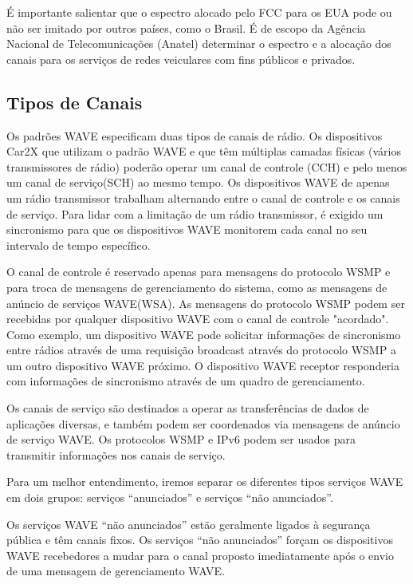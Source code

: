 \documentclass[
12pt,				%
openright,			%
oneside,			%
a4paper,			%
brazil,				%
]{abntex2}
\begin{document}
	\par É importante salientar que o espectro alocado pelo FCC para os EUA pode ou não ser imitado por outros países, como o Brasil. É de escopo da Agência Nacional de Telecomunicações (Anatel) determinar o espectro e a alocação dos canais para os serviços de redes veiculares com fins públicos e privados.
	
	\subsection{Tipos de Canais}
	
	\par Os padrões WAVE especificam duas tipos de canais de rádio. Os dispositivos Car2X que utilizam o padrão WAVE e que têm múltiplas camadas físicas (vários transmissores de rádio) poderão operar um canal de controle (CCH) e pelo menos um canal de serviço(SCH) ao mesmo tempo. Os dispositivos WAVE de apenas um rádio transmissor trabalham alternando entre o canal de controle e os canais de serviço. Para lidar com a limitação de um rádio transmissor, é exigido um sincronismo para que os dispositivos WAVE monitorem cada canal no seu intervalo de tempo específico.
	
	\par O canal de controle é reservado apenas para mensagens do protocolo WSMP e para troca de mensagens de gerenciamento do sistema, como as mensagens de anúncio de serviços WAVE(WSA). As mensagens do protocolo WSMP podem ser recebidas por qualquer dispositivo WAVE com o canal de controle "acordado". Como exemplo, um dispositivo WAVE pode solicitar informações de sincronismo entre rádios através de uma requisição broadcast através do protocolo WSMP a um outro dispositivo WAVE próximo. O dispositivo WAVE receptor responderia com informações de sincronismo através de um quadro de gerenciamento.
	
	\par Os canais de serviço são destinados a operar as transferências de dados de aplicações  diversas, e também podem ser coordenados via mensagens de anúncio de serviço WAVE. Os protocolos WSMP e IPv6 podem ser usados para transmitir informações nos canais de serviço. 
	
	\par Para um melhor entendimento, iremos separar os diferentes tipos serviços WAVE em dois grupos: serviços “anunciados” e serviços “não anunciados”. 
	
	\par Os serviços WAVE “não anunciados” estão geralmente ligados à segurança pública e têm canais fixos. Os serviços “não anunciados” forçam os dispositivos WAVE recebedores a mudar para o canal proposto imediatamente após o envio de uma mensagem de gerenciamento WAVE.
	
\end{document}
